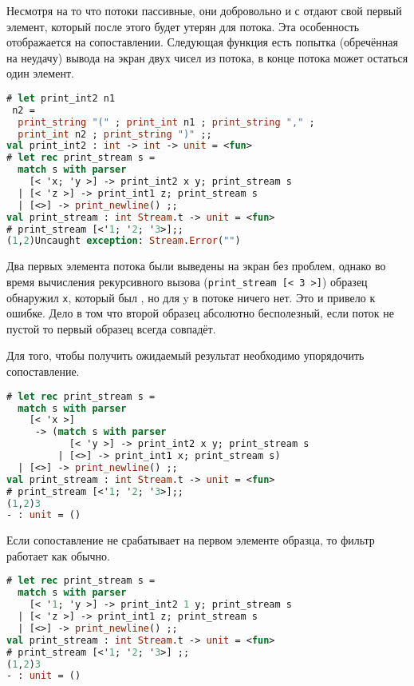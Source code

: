 Несмотря на то что потоки пассивные, они добровольно и с  отдают
свой первый элемент, который после этого будет утерян для потока. Эта
особенность отображается на сопоставлении. Следующая функция есть попытка
(обречённая на неудачу) вывода на экран двух чисел из потока, в конце потока
может остаться один элемент.

\begin{lstlisting}[language=OCaml]
# let print_int2 n1
 n2 =
  print_string "(" ; print_int n1 ; print_string "," ;
  print_int n2 ; print_string ")" ;;
val print_int2 : int -> int -> unit = <fun>
# let rec print_stream s =
  match s with parser
    [< 'x; 'y >] -> print_int2 x y; print_stream s
  | [< 'z >] -> print_int1 z; print_stream s
  | [<>] -> print_newline() ;;
val print_stream : int Stream.t -> unit = <fun>
# print_stream [<'1; '2; '3>];;
(1,2)Uncaught exception: Stream.Error("")
\end{lstlisting}

Два первых элемента потока были выведены на экран без проблем, однако во время
вычисления рекурсивного вызова (\texttt{print\_stream [< 3 >]}) образец
обнаружил \texttt{x}, который был , но для y в потоке ничего
нет. Это и привело к ошибке. Дело в том что второй образец абсолютно
бесполезный, если поток не пустой то первый образец всегда совпадёт.

Для того, чтобы получить ожидаемый результат необходимо упорядочить
сопоставление.

\begin{lstlisting}[language=OCaml]
# let rec print_stream s =
  match s with parser
    [< 'x >]
     -> (match s with parser
           [< 'y >] -> print_int2 x y; print_stream s
         | [<>] -> print_int1 x; print_stream s)
  | [<>] -> print_newline() ;;
val print_stream : int Stream.t -> unit = <fun>
# print_stream [<'1; '2; '3>];;
(1,2)3
- : unit = ()
\end{lstlisting}

Если сопоставление не срабатывает на первом элементе образца, то фильтр работает
как обычно. 

\begin{lstlisting}[language=OCaml]
# let rec print_stream s =
  match s with parser
    [< '1; 'y >] -> print_int2 1 y; print_stream s
  | [< 'z >] -> print_int1 z; print_stream s
  | [<>] -> print_newline() ;;
val print_stream : int Stream.t -> unit = <fun>
# print_stream [<'1; '2; '3>] ;;
(1,2)3
- : unit = ()
\end{lstlisting}

